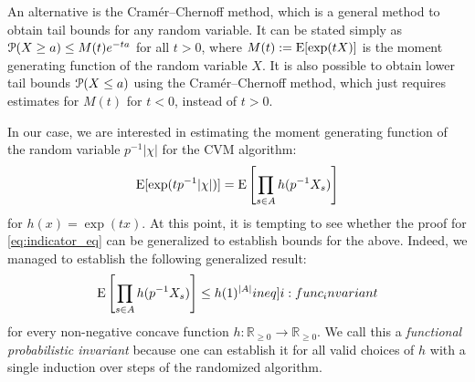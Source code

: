 An alternative is the Cram\'{e}r--Chernoff method, which is a general method to obtain tail bounds for any random variable.
It can be stated simply as $\operatorname{\mathcal P}(X \geq a) \leq M(t) e^{-ta}$ for all $t > 0$, where $M(t) := \operatorname{\mathrm{E}} [\exp(t X)]$ is the moment generating function of the random variable $X$.
It is also possible to obtain lower tail bounds $\operatorname{\mathcal P}(X \leq a)$ using the Cram\'{e}r--Chernoff method, which just requires estimates for $M(t)$ for $t < 0$, instead of $t > 0$.

In our case, we are interested in estimating the moment generating function of the random variable $p^{-1} |\chi|$ for the CVM algorithm:
\[
  \operatorname{\mathrm{E}} [\exp( t p^{-1} |\chi| )] = \operatorname{\mathrm{E}} \left[ \prod_{s \in A} h(p^{-1} X_s) \right]
\]
for $h(x) = \exp(tx)$.
At this point, it is tempting to see whether the proof for \cref{eq:indicator_eq} can be generalized to establish bounds for the above.
Indeed, we managed to establish the following generalized result:
\begin{align}
  \expect \left[ \prod_{s \in A} h(p^{-1} X_s) \right] \leq h(1)^{|A|} \label[ineq]{i:func_invariant}
\end{align}
for every non-negative concave function $h : \mathbb R_{\geq 0} \rightarrow \mathbb R_{\geq 0}$.
We call this a \emph{functional probabilistic invariant} because one can establish it for all valid choices of $h$ with a single induction over steps of the randomized algorithm.

